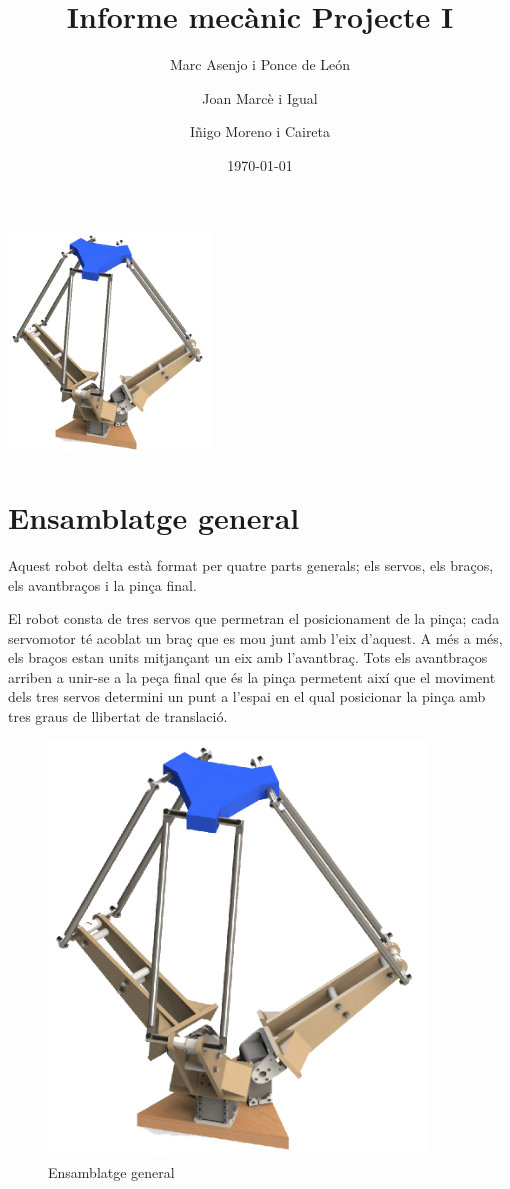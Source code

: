 \documentclass[a4paper, 12pt]{article}
\begin{document}
\title{Informe mecànic Projecte I}
\author{Marc Asenjo i Ponce de León \and
		Joan Marcè i Igual \and
		Iñigo Moreno i Caireta}
\date{\today}
\maketitle
\begin{center}
\includegraphics[width=0.4\textwidth]{./imgComp/logo}
\end{center}

\newpage
\tableofcontents{}

\newpage
\section{Ensamblatge general}

Aquest robot delta està format per quatre parts generals; els servos, els braços, els avantbraços i la pinça final. 

El robot consta de tres servos que permetran el posicionament de la pinça; cada servomotor té acoblat un braç que es mou junt amb l'eix d'aquest. A més a més, els
braços estan units mitjançant un eix amb l'avantbraç. Tots els avantbraços arriben a unir-se a la peça final que és la pinça permetent així que el moviment dels tres servos determini un punt a l'espai en el qual posicionar la pinça amb tres graus de llibertat de translació.

\begin{figure}[h!]
\centering
\includegraphics[width=10cm]{./imgComp/general}
\caption{Ensamblatge general}
\end{figure}
\end{document}
